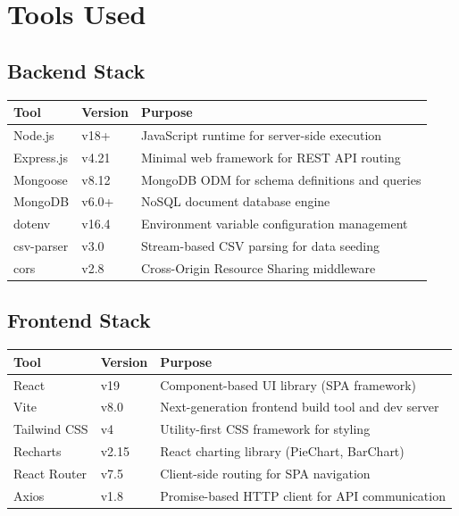 \documentclass[12pt,a4paper]{article}
\begin{document}
\newpage
\section{Tools Used}

\subsection{Backend Stack}

\begin{tabular}{|l|l|p{5.5cm}|}
    \hline
    \textbf{Tool} & \textbf{Version} & \textbf{Purpose} \\
    \hline
    Node.js & v18+ & JavaScript runtime for server-side execution \\
    \hline
    Express.js & v4.21 & Minimal web framework for REST API routing \\
    \hline
    Mongoose & v8.12 & MongoDB ODM for schema definitions and queries \\
    \hline
    MongoDB & v6.0+ & NoSQL document database engine \\
    \hline
    dotenv & v16.4 & Environment variable configuration management \\
    \hline
    csv-parser & v3.0 & Stream-based CSV parsing for data seeding \\
    \hline
    cors & v2.8 & Cross-Origin Resource Sharing middleware \\
    \hline
\end{tabular}

\subsection{Frontend Stack}

\begin{tabular}{|l|l|p{5.5cm}|}
    \hline
    \textbf{Tool} & \textbf{Version} & \textbf{Purpose} \\
    \hline
    React & v19 & Component-based UI library (SPA framework) \\
    \hline
    Vite & v8.0 & Next-generation frontend build tool and dev server \\
    \hline
    Tailwind CSS & v4 & Utility-first CSS framework for styling \\
    \hline
    Recharts & v2.15 & React charting library (PieChart, BarChart) \\
    \hline
    React Router & v7.5 & Client-side routing for SPA navigation \\
    \hline
    Axios & v1.8 & Promise-based HTTP client for API communication \\
    \hline
\end{tabular}
\end{document}
